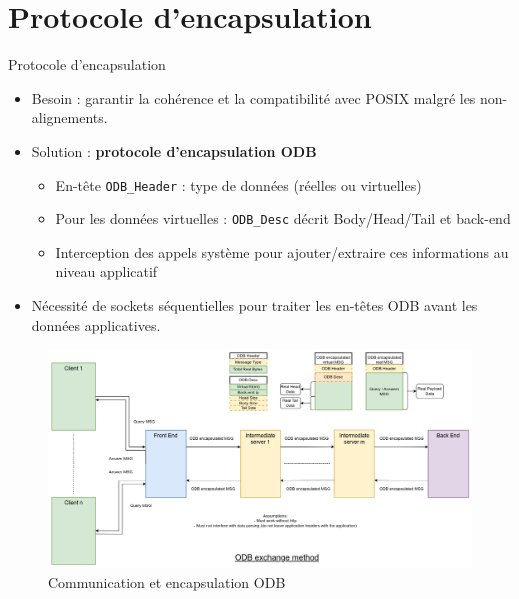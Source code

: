 \documentclass[aspectratio=43,8pt]{beamer}
\begin{document}
\section{Protocole d'encapsulation}
\begin{frame}{Protocole d'encapsulation}
\begin{itemize}
    \item Besoin : garantir la cohérence et la compatibilité avec POSIX malgré les non-alignements.
    \item Solution : \textbf{protocole d'encapsulation ODB} 
    \begin{itemize}
        \item En-tête \texttt{ODB\_Header} : type de données (réelles ou virtuelles)
        \item Pour les données virtuelles : \texttt{ODB\_Desc} décrit Body/Head/Tail et back-end
        \item Interception des appels système pour ajouter/extraire ces informations au niveau applicatif
    \end{itemize}
    \item Nécessité de sockets séquentielles pour traiter les en-têtes ODB avant les données applicatives.
\end{itemize}
\begin{figure}
    \centering
    \includegraphics[scale=0.3]{img2/odb_communication.png}
    \caption{Communication et encapsulation ODB}
\end{figure}
\end{frame}
\end{document}
